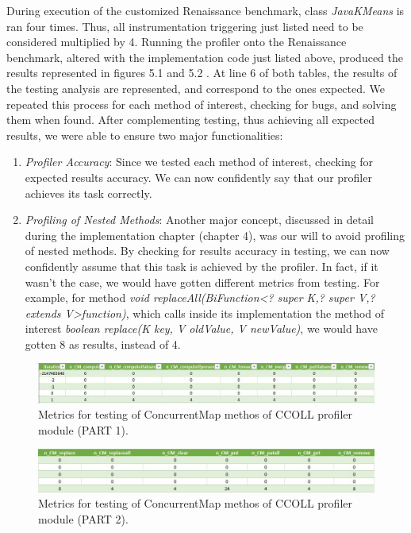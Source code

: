 \documentclass[]{usiinfthesis}
\begin{document}
During execution of the customized Renaissance benchmark, class \textit{JavaKMeans} is ran four times. Thus, all instrumentation triggering just listed need to be considered multiplied by 4. Running the profiler onto the Renaissance benchmark, altered with the implementation code just listed above, produced the results represented in figures 5.1 and 5.2 . At line 6 of both tables, the results of the testing analysis are represented, and correspond to the ones expected.
\newline \newline
We repeated this process for each method of interest, checking for bugs, and solving them when found. After complementing testing, thus achieving all expected results, we were able to ensure two major functionalities:
\begin{enumerate}
    \item \textit{Profiler Accuracy}: Since we tested each method of interest, checking for expected results accuracy. We can now confidently say that our profiler achieves its task correctly.    \item \textit{Profiling of Nested Methods}: Another major concept, discussed in detail during the implementation chapter (chapter 4), was our will to avoid profiling of nested methods. By checking for results accuracy in testing, we can now confidently assume that this task is achieved by the profiler. In fact, if it wasn't the case, we would have gotten different metrics from testing. For example, for method \textit{void replaceAll(BiFunction<? super K,? super V,? extends V>function)}, which calls inside its implementation the method of interest \textit{boolean replace(K key, V oldValue, V newValue)}, we would have gotten 8 as results, instead of 4.
\end{enumerate}


    \vspace{0.5cm}
\begin{figure}[h]
    \centering
    \includegraphics[scale=0.5]{Immagini/testing.JPG} 
    \caption{Metrics for testing of ConcurrentMap methos of CCOLL profiler module (PART 1). }
    \label{fig:fig1}
\end{figure}
\begin{figure}[h]
    \centering
    \includegraphics[scale=0.5]{Immagini/testing2.JPG} 
    \caption{Metrics for testing of ConcurrentMap methos of CCOLL profiler module (PART 2).}
    \label{fig:fig1}
\end{figure}
\end{document}
